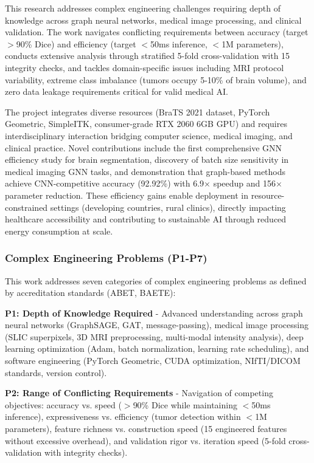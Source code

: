 This research addresses complex engineering challenges requiring depth of knowledge across graph neural networks, medical image processing, and clinical validation. The work navigates conflicting requirements between accuracy (target $>$90\% Dice) and efficiency (target $<$50ms inference, $<$1M parameters), conducts extensive analysis through stratified 5-fold cross-validation with 15 integrity checks, and tackles domain-specific issues including MRI protocol variability, extreme class imbalance (tumors occupy 5-10\% of brain volume), and zero data leakage requirements critical for valid medical AI.

The project integrates diverse resources (BraTS 2021 dataset, PyTorch Geometric, SimpleITK, consumer-grade RTX 2060 6GB GPU) and requires interdisciplinary interaction bridging computer science, medical imaging, and clinical practice. Novel contributions include the first comprehensive GNN efficiency study for brain segmentation, discovery of batch size sensitivity in medical imaging GNN tasks, and demonstration that graph-based methods achieve CNN-competitive accuracy (92.92\%) with 6.9$\times$ speedup and 156$\times$ parameter reduction. These efficiency gains enable deployment in resource-constrained settings (developing countries, rural clinics), directly impacting healthcare accessibility and contributing to sustainable AI through reduced energy consumption at scale.

\subsubsection{Complex Engineering Problems (P1-P7)}

This work addresses seven categories of complex engineering problems as defined by accreditation standards (ABET, BAETE):

\textbf{P1: Depth of Knowledge Required} - Advanced understanding across graph neural networks (GraphSAGE, GAT, message-passing), medical image processing (SLIC superpixels, 3D MRI preprocessing, multi-modal intensity analysis), deep learning optimization (Adam, batch normalization, learning rate scheduling), and software engineering (PyTorch Geometric, CUDA optimization, NIfTI/DICOM standards, version control).

\textbf{P2: Range of Conflicting Requirements} - Navigation of competing objectives: accuracy vs. speed ($>$90\% Dice while maintaining $<$50ms inference), expressiveness vs. efficiency (tumor detection within $<$1M parameters), feature richness vs. construction speed (15 engineered features without excessive overhead), and validation rigor vs. iteration speed (5-fold cross-validation with integrity checks).

